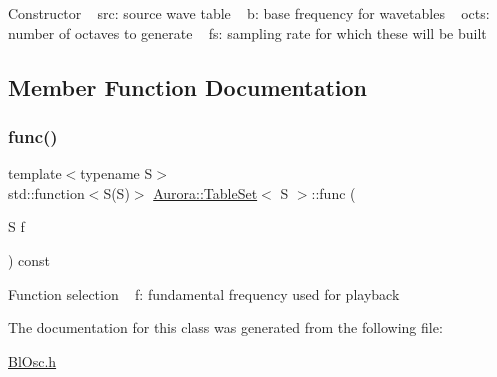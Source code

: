 Constructor ~\newline
src\+: source wave table ~\newline
b\+: base frequency for wavetables ~\newline
octs\+: number of octaves to generate ~\newline
fs\+: sampling rate for which these will be built 

\subsection{Member Function Documentation}
\mbox{\label{class_aurora_1_1_table_set_a27a325a2c3c4b8cd50e0c86d6ac3c617}} 
\subsubsection{\texorpdfstring{func()}{func()}}
{\footnotesize\ttfamily template$<$typename S$>$ \\
std\+::function$<$S(S)$>$ \hyperlink{class_aurora_1_1_table_set}{Aurora\+::\+Table\+Set}$<$ S $>$\+::func (\begin{DoxyParamCaption}\item[{S}]{f }\end{DoxyParamCaption}) const\hspace{0.3cm}{\ttfamily [inline]}}

Function selection ~\newline
f\+: fundamental frequency used for playback 

The documentation for this class was generated from the following file\+:\begin{DoxyCompactItemize}
\item 
\hyperlink{_bl_osc_8h}{Bl\+Osc.\+h}\end{DoxyCompactItemize}
